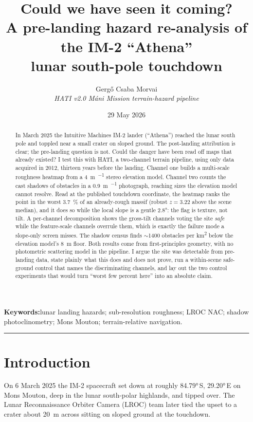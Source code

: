 \documentclass[11pt]{article}
\title{\sffamily\bfseries\color{hatiblue}\LARGE Could we have seen it coming?\\[2pt]
\Large A pre-landing hazard re-analysis of the IM-2 ``Athena''\\ lunar south-pole touchdown}
\author{\large Gergő Csaba Morvai\\[2pt]
\normalsize\itshape HATI v2.0 \textendash{} M\'ani Mission terrain-hazard pipeline}
\date{\normalsize 29 May 2026}
\begin{document}
\maketitle

\begin{abstract}
\noindent
In March 2025 the Intuitive Machines IM-2 lander (``Athena'') reached the lunar
south pole and toppled near a small crater on sloped ground. The post-landing
attribution is clear; the pre-landing question is not. Could the danger have been
read off maps that already existed? I test this with HATI, a two-channel terrain
pipeline, using only data acquired in 2012, thirteen years before the landing.
Channel one builds a multi-scale roughness heatmap from a \SI{4}{\meter\per\px}
stereo elevation model. Channel two counts the cast shadows of obstacles in a
\SI{0.9}{\meter\per\px} photograph, reaching sizes the elevation model cannot
resolve. Read at the published touchdown coordinate, the heatmap ranks the point in
the worst \SI{3.7}{\percent} of an already-rough massif (robust $z=3.22$ above the
scene median), and it does so while the local slope is a gentle \ang{2.8}: the flag
is texture, not tilt. A per-channel decomposition shows the gross-tilt channels
voting the site \emph{safe} while the feature-scale channels overrule them, which is
exactly the failure mode a slope-only screen misses. The shadow census finds
$\sim$\num{1400} obstacles per \si{\kilo\meter\squared} below the elevation model's
\SI{8}{\meter} floor. Both results come from first-principles geometry, with no
photometric scattering model in the pipeline. I argue the site was detectable from
pre-landing data, state plainly what this does and does not prove, run a within-scene safe-ground control that names the discriminating
channels, and lay out the two control experiments that would turn ``worst few percent here'' into an absolute
claim.
\end{abstract}

\noindent\textbf{\sffamily\color{hatiblue}Keywords:}\enspace lunar landing hazards;
sub-resolution roughness; LROC NAC; shadow photoclinometry; Mons Mouton; terrain-relative navigation.

\medskip
\hrule
\medskip

\section{Introduction}

On 6 March 2025 the IM-2 spacecraft set down at roughly \ang{84.79}\,S,
\ang{29.20}\,E on Mons Mouton, deep in the lunar south-polar highlands, and tipped
over. The Lunar Reconnaissance Orbiter Camera (LROC) team later tied the upset to a
crater about \SI{20}{\meter} across sitting on sloped ground at the touchdown.
\end{document}
